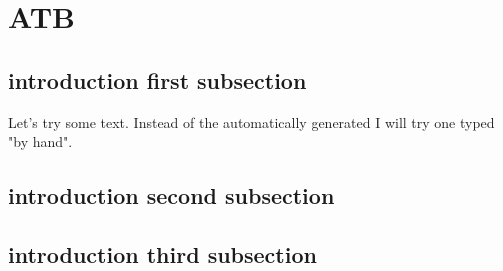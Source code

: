\documentclass[crop=false]{standalone}
\begin{document}
\section{ATB}

\subsection{introduction first subsection}
Let's try some text. Instead of the automatically generated
I will try one typed "by hand".

\subsection{introduction second subsection}


\subsection{introduction third subsection}

\end{document}

